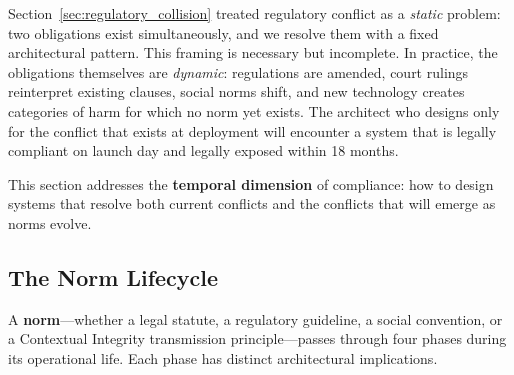 Section~\ref{sec:regulatory_collision} treated regulatory conflict as a \emph{static} problem: two obligations exist simultaneously, and we resolve them with a fixed architectural pattern. This framing is necessary but incomplete. In practice, the obligations themselves are \emph{dynamic}: regulations are amended, court rulings reinterpret existing clauses, social norms shift, and new technology creates categories of harm for which no norm yet exists. The architect who designs only for the conflict that exists at deployment will encounter a system that is legally compliant on launch day and legally exposed within 18 months.

This section addresses the \textbf{temporal dimension} of compliance: how to design systems that resolve both current conflicts and the conflicts that will emerge as norms evolve.

\subsection{The Norm Lifecycle}
\label{subsec:norm_lifecycle}

A \textbf{norm}---whether a legal statute, a regulatory guideline, a social convention, or a Contextual Integrity transmission principle---passes through four phases during its operational life. Each phase has distinct architectural implications.

